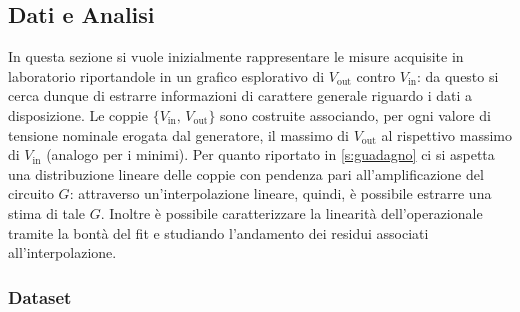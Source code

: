 \documentclass[a4paper,11pt]{article} %
\begin{document}
\subsection{Dati e Analisi}

In questa sezione si vuole inizialmente rappresentare le misure acquisite in laboratorio riportandole in un grafico
esplorativo di $V_{\text{out}}$ contro $V_{\text{in}}$: da questo si cerca dunque di estrarre informazioni di carattere
generale riguardo i dati a disposizione. Le coppie $\{V_{\text{in}},\,V_{\text{out}}\}$ sono costruite associando, per
ogni valore di tensione nominale erogata dal generatore, il massimo di $V_{\text{out}}$ al rispettivo massimo di
$V_{\text{in}}$ (analogo per i minimi). Per quanto riportato in \autoref{s:guadagno} ci si aspetta una distribuzione
lineare delle coppie con pendenza pari all'amplificazione del circuito $G$: attraverso un'interpolazione lineare,
quindi, è possibile estrarre una stima di tale $G$. Inoltre è possibile caratterizzare la linearità dell'operazionale
tramite la bontà del fit e studiando l'andamento dei residui associati all'interpolazione.



\subsubsection{Dataset}
\end{document}
